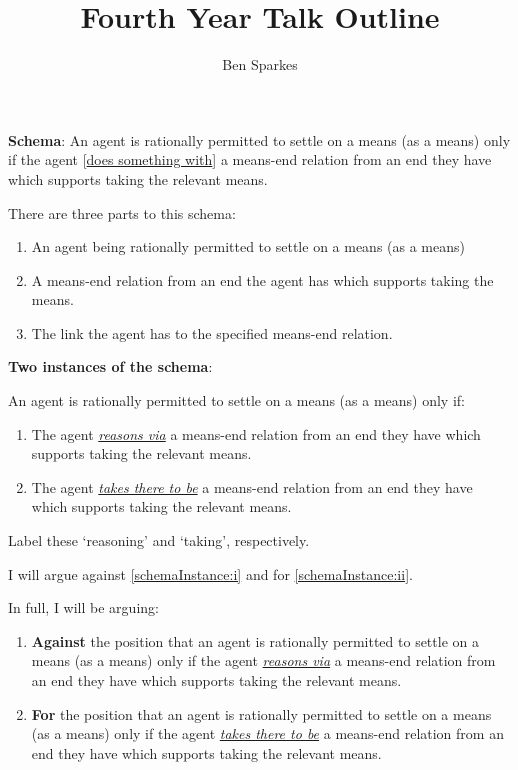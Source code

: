 \documentclass[10pt]{article}
\title{Fourth Year Talk Outline}
\author{Ben Sparkes}
\newcommand{\hozlinedash}[0]{%
  \noindent\hdashrule[0.5ex][c]{\textwidth}{.1pt}{2.5pt}
}
\begin{document}

\textbf{Schema}:
An agent is rationally permitted to settle on a means (as a means) only if the agent [\underline{does something with}] a means-end relation from an end they have which supports taking the relevant means.

\hozlinedash

There are three parts to this schema:
\begin{enumerate}[label=\alph*., noitemsep]
\item An agent being rationally permitted to settle on a means (as a means)
\item A means-end relation from an end the agent has which supports taking the means.
\item The link the agent has to the specified means-end relation.
\end{enumerate}

\hozlinedash

\textbf{Two instances of the schema}:

An agent is rationally permitted to settle on a means (as a means) only if:
\begin{enumerate}[label=\roman*., ref=(\roman*)]
\item\label{schemaInstance:i} The agent \underline{\emph{reasons via}} a means-end relation from an end they have which supports taking the relevant means.
\item\label{schemaInstance:ii} The agent \underline{\emph{takes there to be}} a means-end relation from an end they have which supports taking the relevant means.
\end{enumerate}

Label these `reasoning' and `taking', respectively.

\hozlinedash

I will argue against \ref{schemaInstance:i} and for \ref{schemaInstance:ii}.

In full, I will be arguing:
\begin{enumerate}[label=\Roman*., ref=(\Roman*)]
\item\label{position:Against} \textbf{Against} the position that an agent is rationally permitted to settle on a means (as a means) only if the agent \underline{\emph{reasons via}} a means-end relation from an end they have which supports taking the relevant means.

\item\label{position:For} \textbf{For} the position that an agent is rationally permitted to settle on a means (as a means) only if the agent \underline{\emph{takes there to be}} a means-end relation from an end they have which supports taking the relevant means.
\end{enumerate}
\end{document}
